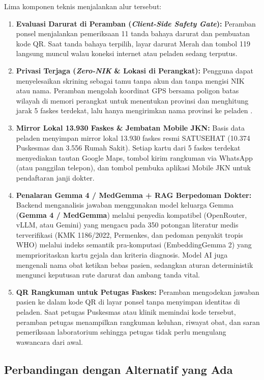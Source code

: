 Lima komponen teknis menjalankan alur tersebut:
\begin{enumerate}
    \item \textbf{Evaluasi Darurat di Peramban (\textit{Client-Side Safety Gate}):} Peramban ponsel menjalankan pemeriksaan 11 tanda bahaya darurat dan pembuatan kode QR. Saat tanda bahaya terpilih, layar darurat Merah dan tombol 119 langsung muncul walau koneksi internet atau peladen sedang terputus.
    \item \textbf{Privasi Terjaga (\textit{Zero-NIK} \& Lokasi di Perangkat):} Pengguna dapat menyelesaikan skrining sebagai tamu tanpa akun dan tanpa mengisi NIK atau nama. Peramban mengolah koordinat GPS bersama poligon batas wilayah di memori perangkat untuk menentukan provinsi dan menghitung jarak 5 faskes terdekat, lalu hanya mengirimkan nama provinsi ke peladen \citep{UUPDP2022}.
    \item \textbf{Mirror Lokal 13.930 Faskes \& Jembatan Mobile JKN:} Basis data peladen menyimpan mirror lokal 13.930 faskes resmi SATUSEHAT (10.374 Puskesmas dan 3.556 Rumah Sakit). Setiap kartu dari 5 faskes terdekat menyediakan tautan Google Maps, tombol kirim rangkuman via WhatsApp (atau panggilan telepon), dan tombol pembuka aplikasi Mobile JKN untuk pendaftaran janji dokter.
    \item \textbf{Penalaran Gemma 4 / MedGemma + RAG Berpedoman Dokter:} Backend menganalisis jawaban menggunakan model keluarga Gemma (\textbf{Gemma 4 / MedGemma}) melalui penyedia kompatibel (OpenRouter, vLLM, atau Gemini) yang mengacu pada 350 potongan literatur medis terverifikasi (KMK 1186/2022, Permenkes, dan pedoman penyakit tropis WHO) melalui indeks semantik pra-komputasi (EmbeddingGemma 2) yang memprioritaskan kartu gejala dan kriteria diagnosis. Model AI juga mengenali nama obat ketikan bebas pasien, sedangkan aturan deterministik mengunci keputusan rute darurat dan ambang tanda vital.
    \item \textbf{QR Rangkuman untuk Petugas Faskes:} Peramban mengodekan jawaban pasien ke dalam kode QR di layar ponsel tanpa menyimpan identitas di peladen. Saat petugas Puskesmas atau klinik memindai kode tersebut, peramban petugas menampilkan rangkuman keluhan, riwayat obat, dan saran pemeriksaan laboratorium sehingga petugas tidak perlu mengulang wawancara dari awal.
\end{enumerate}

\subsection{Perbandingan dengan Alternatif yang Ada}

